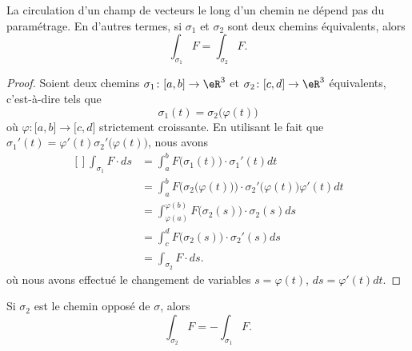 \begin{proposition}
	La circulation d'un champ de vecteurs le long d'un chemin ne dépend pas du paramétrage. En d'autres termes, si \( \sigma_1\) et \( \sigma_2\) sont deux chemins équivalents, alors
	\begin{equation}
		\int_{\sigma_1}F=\int_{\sigma_2}F.
	\end{equation}
\end{proposition}

\begin{proof}
	Soient deux chemins \( \sigma_1\colon \mathopen[ a , b \mathclose]\to \eR^3\) et \( \sigma_2\colon \mathopen[ c , d \mathclose]\to \eR^3\) équivalents, c'est-à-dire tels que
	\begin{equation}
		\sigma_1(t)=\sigma_2\big( \varphi(t) \big)
	\end{equation}
	où \( \varphi\colon \mathopen[ a , b \mathclose]\to \mathopen[ c , d \mathclose]\) strictement croissante. En utilisant le fait que \( \sigma_1'(t)=\varphi'(t)\sigma_2'\big( \varphi(t) \big)\), nous avons
	\begin{equation}
		\begin{aligned}[]
			\int_{\sigma_1}F\cdot ds & =\int_a^bF\big( \sigma_1(t) \big)\cdot\sigma_1'(t)dt                                                  \\
			                         & =\int_a^bF\Big( \sigma_2\big( \varphi(t) \big) \Big)\cdot\sigma_2'\big( \varphi(t) \big)\varphi'(t)dt \\
			                         & =\int_{\varphi(a)}^{\varphi(b)}F\big( \sigma_2(s) \big)\cdot\sigma_2(s)ds                             \\
			                         & =\int_c^dF\big( \sigma_2(s) \big)\cdot \sigma_2'(s)ds                                                 \\
			                         & =\int_{\sigma_2}F\cdot ds.
		\end{aligned}
	\end{equation}
	où nous avons effectué le changement de variables \( s=\varphi(t)\), \( ds=\varphi'(t)dt\).
\end{proof}

\begin{remark}
	Si \( \sigma_2\) est le chemin opposé de \( \sigma\), alors
	\begin{equation}
		\int_{\sigma_2}F=-\int_{\sigma_1}F.
	\end{equation}
\end{remark}

